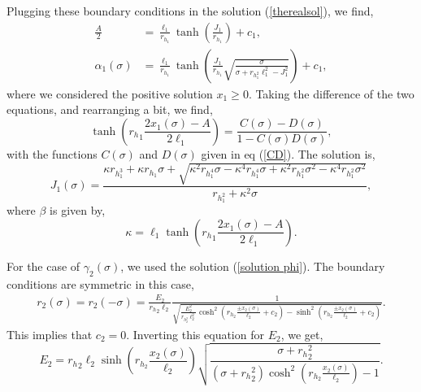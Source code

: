 Plugging these boundary conditions in the solution (\ref{therealsol}), we find,
\begin{align}
    \frac{A}{2} &= \frac{\ell_1}{r_h_1}\tanh\left(\frac{J_1}{r_h_1}\right) + c_1,\\
    \alpha_1(\sigma) &= \frac{\ell_1}{r_h_1}\tanh\left(\frac{J_1}{r_h_1}\sqrt{\frac{\sigma}{\sigma+r_h_1^2\ell_1^2-J_1^2}}\right) + c_1,
\end{align}
where we considered the positive solution $x_1\geq0$. Taking the difference of the two equations, and rearranging a bit, we find,
\begin{equation}
    \tanh \left( {r_h}_1 \frac{2x_1(\sigma) - A}{2\ell_1}\right) = \frac{C(\sigma)-D(\sigma)}{1-C(\sigma)D(\sigma)},
\end{equation}
with the functions $C(\sigma)$ and $D(\sigma)$ given in eq (\ref{CD}). The solution is,
\begin{equation}
    J_1(\sigma) = \frac{\kappa r_h_1^3 + \kappa r_h_1 \sigma + \sqrt{
\kappa^2 r_h_1^4 \sigma - \kappa^4 r_h_1^4 \sigma + \kappa^2 r_h_1^2 \sigma^2 - 
  \kappa^4 r_h_1^2 \sigma^2}}{r_h_1^2 + \kappa^2 \sigma},
\end{equation}
where $\beta$ is given by,
\begin{equation}
    \kappa = \ell_1\tanh\left( {r_h}_1 \frac{2x_1(\sigma) - A}{2\ell_1}\right).
\end{equation}

For the case of $\gamma_2(\sigma)$, we used the solution (\ref{solution phi}). The boundary conditions are symmetric in this case,
\begin{align}
    r_2(\sigma) = r_2(-\sigma) = \frac{E_2}{{r_h}_2\ell_2}\frac{1}{\sqrt{\frac{E_2^2}{r_h_2^2\ell_2^2}\cosh^2\left(r_h_2\frac{\pm x_2(\sigma)}{\ell_2}+c_2\right)-\sinh^2\left(r_h_2\frac{\pm x_2(\sigma)}{\ell_2}+c_2\right)}}.
\end{align}
This implies that $c_2=0$. Inverting this equation for $E_2$, we get,
\begin{equation}
    E_2 = {r_h}_2\ell_2\sinh\left(r_h_2\frac{ x_2(\sigma)}{\ell_2}\right) \sqrt{\frac{\sigma+{r_h}_2^2}{(\sigma+{r_h}_2^2)\cosh^2\left(r_h_2\frac{ x_2(\sigma)}{\ell_2}\right)-1}}.
\end{equation}